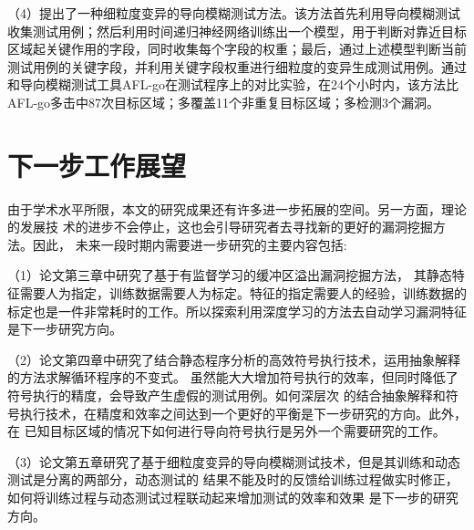 （4）提出了一种细粒度变异的导向模糊测试方法。该方法首先利用导向模糊测试收集测试用例；然后利用时间递归神经网络训练出一个模型，用于判断对靠近目标区域起关键作用的字段，同时收集每个字段的权重；最后，通过上述模型判断当前测试用例的关键字段，并利用关键字段权重进行细粒度的变异生成测试用例。通过和导向模糊测试工具AFL-go在测试程序上的对比实验，在24个小时内，该方法比AFL-go多击中87次目标区域；多覆盖11个非重复目标区域；多检测3个漏洞。


\section{下一步工作展望}
由于学术水平所限，本文的研究成果还有许多进一步拓展的空间。另一方面，理论的发展技
术的进步不会停止，这也会引导研究者去寻找新的更好的漏洞挖掘方法。因此，
未来一段时期内需要进一步研究的主要内容包括:

（1）论文第三章中研究了基于有监督学习的缓冲区溢出漏洞挖掘方法，
其静态特征需要人为指定，训练数据需要人为标定。特征的指定需要人的经验，训练数据的
标定也是一件非常耗时的工作。所以探索利用深度学习的方法去自动学习漏洞特征是下一步研究方向。

（2）论文第四章中研究了结合静态程序分析的高效符号执行技术，运用抽象解释的方法求解循环程序的不变式。
虽然能大大增加符号执行的效率，但同时降低了符号执行的精度，会导致产生虚假的测试用例。如何深层次
的结合抽象解释和符号执行技术，在精度和效率之间达到一个更好的平衡是下一步研究的方向。此外，在
已知目标区域的情况下如何进行导向符号执行是另外一个需要研究的工作。

（3）论文第五章研究了基于细粒度变异的导向模糊测试技术，但是其训练和动态测试是分离的两部分，动态测试的
结果不能及时的反馈给训练过程做实时修正，如何将训练过程与动态测试过程联动起来增加测试的效率和效果
是下一步的研究方向。
